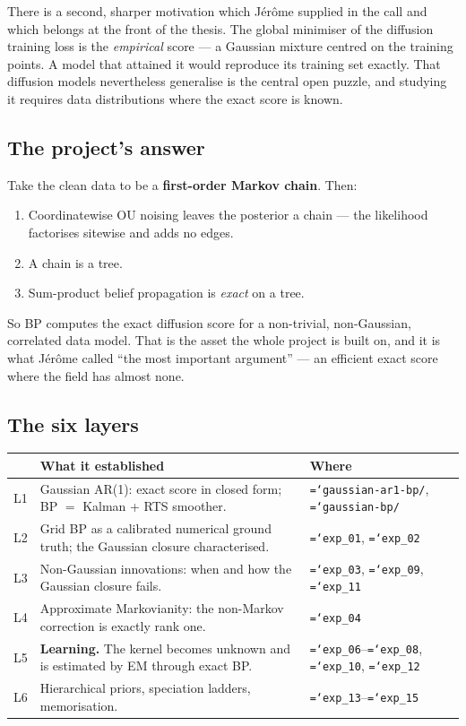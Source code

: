 \documentclass[11pt,a4paper]{article}
\newcommand{\code}[1]{\texttt{\small\hyphenchar\font=`\-\relax #1}}
\begin{document}
There is a second, sharper motivation which J\'er\^ome supplied in the call and which
belongs at the front of the thesis. The global minimiser of the diffusion training loss is
the \emph{empirical} score --- a Gaussian mixture centred on the training points. A model
that attained it would reproduce its training set exactly. That diffusion models
nevertheless generalise is the central open puzzle, and studying it requires data
distributions where the exact score is known.

\subsection{The project's answer}

Take the clean data to be a \textbf{first-order Markov chain}. Then:

\begin{enumerate}
\item Coordinatewise OU noising leaves the posterior a chain --- the likelihood factorises
      sitewise and adds no edges.
\item A chain is a tree.
\item Sum-product belief propagation is \emph{exact} on a tree.
\end{enumerate}

\noindent
So BP computes the exact diffusion score for a non-trivial, non-Gaussian, correlated data
model. That is the asset the whole project is built on, and it is what J\'er\^ome called
``the most important argument'' --- an efficient exact score where the field has almost none.

\subsection{The six layers}

\begin{center}
\begin{tabular}{@{}p{1.1cm}p{6.0cm}p{8.1cm}@{}}
\toprule
& \textbf{What it established} & \textbf{Where} \\
\midrule
L1 & Gaussian AR(1): exact score in closed form; BP $=$ Kalman + RTS smoother. & \code{gaussian-ar1-bp/}, \code{gaussian-bp/} \\
L2 & Grid BP as a calibrated numerical ground truth; the Gaussian closure characterised. & \code{exp\_01}, \code{exp\_02} \\
L3 & Non-Gaussian innovations: when and how the Gaussian closure fails. & \code{exp\_03}, \code{exp\_09}, \code{exp\_11} \\
L4 & Approximate Markovianity: the non-Markov correction is exactly rank one. & \code{exp\_04} \\
L5 & \textbf{Learning.} The kernel becomes unknown and is estimated by EM through exact BP. & \code{exp\_06}--\code{exp\_08}, \code{exp\_10}, \code{exp\_12} \\
L6 & Hierarchical priors, speciation ladders, memorisation. & \code{exp\_13}--\code{exp\_15} \\
\bottomrule
\end{tabular}
\end{center}
\end{document}
